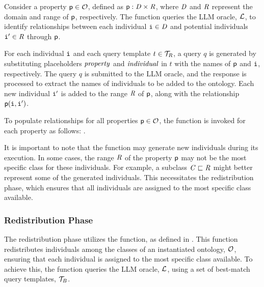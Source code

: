 %
Consider a property \(\relation{p} \in \relset{O}\), defined as \(\relation{p} : \concept{D} \times \concept{R}\), where \(\concept{D}\) and \(\concept{R}\) represent the domain and range of \(\relation{p}\), respectively.
%
The function queries the \gls{LLM} oracle, \(\relset{L}\), to identify relationships between each individual \(\instance{i} \in \concept{D}\) and potential individuals \(\instance{i}' \in \concept{R}\) through \(\relation{p}\).

%
For each individual \(\instance{i}\) and each query template \(t \in \relset{T}_{R}\), a query \(q\) is generated by substituting placeholders \(\mathit{property}\) and \(\mathit{individual}\) in \(t\) with the names of \(\relation{p}\) and \(\instance{i}\), respectively.
%
The query \(q\) is submitted to the \gls{LLM} oracle, and the response is processed to extract the names of individuals to be added to the ontology.
%
Each new individual \(\instance{i}'\) is added to the range \(\concept{R}\) of \(\relation{p}\), along with the relationship \(\relation{p}(\instance{i}, \instance{i}')\).

%
To populate relationships for all properties \(\relation{p} \in \relset{O}\), the function is invoked for each property as follows:
%
.

%
It is important to note that the \relate{} function may generate new individuals during its execution.
%
In some cases, the range \(\concept{R}\) of the property \(\relation{p}\) may not be the most specific class for these individuals.
%
For example, a subclass \(\concept{C} \sqsubset \concept{R}\) might better represent some of the generated individuals.
%
This necessitates the redistribution phase, which ensures that all individuals are assigned to the most specific class available.


\subsubsection{Redistribution Phase}
\label{subsubsec:redistribution-phase}
%

%
The redistribution phase utilizes the \redistribute{} function, as defined in .
%
This function redistributes individuals among the classes of an instantiated ontology, \(\relset{O}\), ensuring that each individual is assigned to the most specific class available.
%
To achieve this, the function queries the \gls{LLM} oracle, \(\relset{L}\), using a set of best-match query templates, \(\relset{T}_{B}\).

